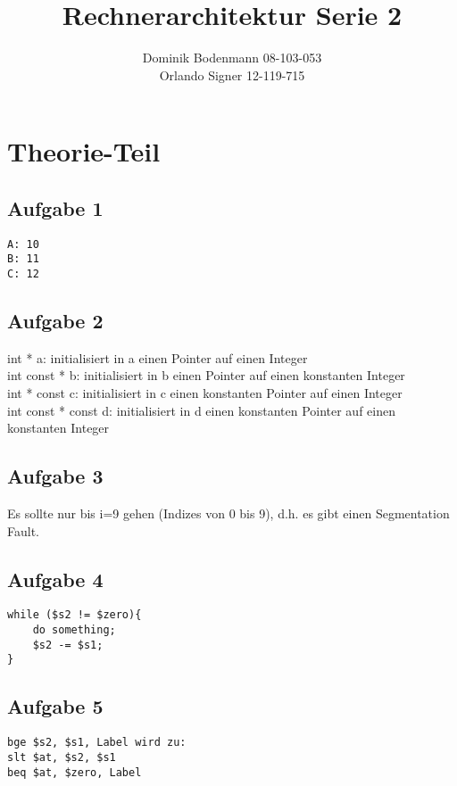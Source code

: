 \documentclass[a4paper,abstracton]{scrartcl}
\title{Rechnerarchitektur Serie 2}
\author{Dominik Bodenmann 08-103-053\\
	Orlando Signer 12-119-715\\}
\begin{document}
\maketitle

\section{Theorie-Teil}
\subsection{Aufgabe 1}
\begin{lstlisting}[caption=Ausgabe]
A: 10
B: 11
C: 12
\end{lstlisting}

\subsection{Aufgabe 2}
int * a: initialisiert in a einen Pointer auf einen Integer\\
int const * b: initialisiert in b einen Pointer auf einen konstanten Integer\\
int * const c: initialisiert in c einen konstanten Pointer auf einen Integer\\
int const * const d: initialisiert in d einen konstanten Pointer auf einen konstanten Integer\\

\subsection{Aufgabe 3}
Es sollte nur bis i=9 gehen (Indizes von 0 bis 9), d.h. es gibt einen Segmentation Fault.

\subsection{Aufgabe 4}
\begin{lstlisting}[caption=C-Code]
while ($s2 != $zero){
	do something;
	$s2 -= $s1;
}
\end{lstlisting}

\newpage
\subsection{Aufgabe 5}
\begin{lstlisting}[caption=Erweiterung]
bge $s2, $s1, Label wird zu:
slt $at, $s2, $s1
beq $at, $zero, Label
\end{lstlisting}
\end{document}
